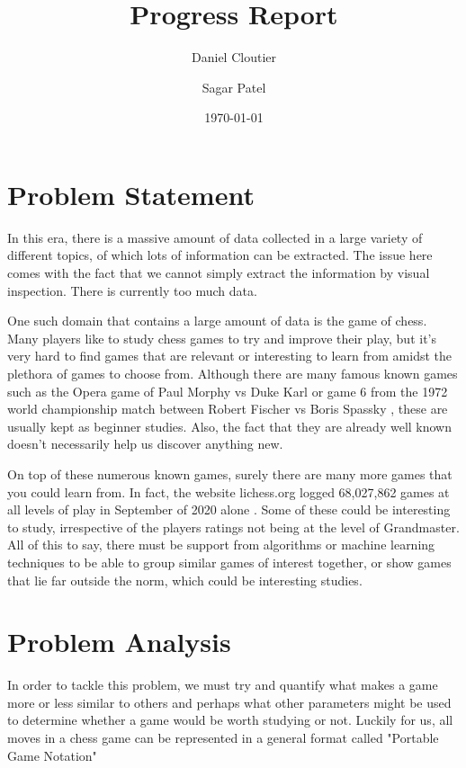 \documentclass[12pt]{article}
\title{Progress Report}
\author{Daniel Cloutier \and Sagar Patel}
\date{\today}
\begin{document}
    \begin{singlespace}
        \maketitle 
    \end{singlespace}

    \section{Problem Statement}

    In this era, there is a massive amount of data collected in a large variety of different topics, of which lots of information can be extracted. The issue here comes with the fact that we cannot simply extract the information by visual inspection. There is currently too much data. 
    
    One such domain that contains a large amount of data is the game of chess. Many players like to study chess games to try and improve their play, but it's very hard to find games that are relevant or interesting to learn from amidst the plethora of games to choose from. Although there are many famous known games such as the Opera game of Paul Morphy vs Duke Karl or game 6 from the 1972 world championship match between Robert Fischer vs Boris Spassky \cite{chessgames}, these are usually kept as beginner studies. Also, the fact that they are already well known doesn't necessarily help us discover anything new. 
    
    On top of these numerous known games, surely there are many more games that you could learn from. In fact, the website lichess.org logged 68,027,862 games at all levels of play in September of 2020 alone \cite{lichessdb}. Some of these could be interesting to study, irrespective of the players ratings not being at the level of Grandmaster. All of this to say, there must be support from algorithms or machine learning techniques to be able to group similar games of interest together, or show games that lie far outside the norm, which could be interesting studies.

    \section{Problem Analysis}

    In order to tackle this problem, we must try and quantify what makes a game more or less similar to others and perhaps what other parameters might be used to determine whether a game would be worth studying or not. Luckily for us, all moves in a chess game can be represented in a general format called "Portable Game Notation"
\end{document}
